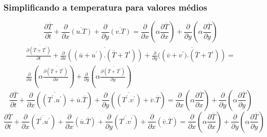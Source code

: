 \documentclass[xcolor=dvipsnames,10pt,aspectratio=169]{beamer}
\begin{document}
		
		\begin{frame}
		\frametitle{Simplificando a temperatura para valores médios}
		\begin{equation}
		\frac{\partial \overline{T}}{\partial t} + {\frac{\partial{}}{\partial{x}} \overline{(u . T)}} + 
		{\frac{\partial{}}{\partial{y}} \overline{(v . T)}} 
		=
		{\frac{\partial{}}{\partial{x}}} \left(\alpha {\frac{\partial{\overline{T}}}{\partial{x}}} \right) +
		{\frac{\partial{}}{\partial{y}}} \left(\alpha {\frac{\partial{\overline{T}}}{\partial{y}}} \right) 
		\end{equation}
		\begin{equation}
		\begin{split}
		\frac{\partial \overline{(\overline{T} + T^\prime)}}{\partial t} +{\frac{\partial{}}{\partial{x}} \overline{\left((\overline{u} + u^\prime) . (\overline{T} + T^\prime) \right)}} + 
		{\frac{\partial{}}{\partial{y}} \overline{(\left(\overline{v} + v^\prime) . (\overline{T} + T^\prime) \right)}} 
		= \\
		{\frac{\partial{}}{\partial{x}}} \left(\alpha {\frac{\partial{\overline{(\overline{T} + T^\prime)}}}{\partial{x}}} \right) +
		{\frac{\partial{}}{\partial{y}}} \left(\alpha {\frac{\partial{\overline{(\overline{T} + T^\prime)}}}{\partial{y}}} \right) 
		\end{split}
		\end{equation}
		\begin{equation}
		\frac{\partial \overline{T}}{\partial t} +\frac{\partial{}}{\partial{x}} \left(\overline{\left({T^\prime . u^\prime}\right)} + \overline{u}.\overline{T}\right)     + 
		\frac{\partial{}}{\partial{y}} \left(\overline{\left({T^\prime . v^\prime}\right)} + \overline{v}.\overline{T}\right) 
		=
		{\frac{\partial{}}{\partial{x}}} \left(\alpha {\frac{\partial{\overline{T}}}{\partial{x}}} \right) +
		{\frac{\partial{}}{\partial{y}}} \left(\alpha {\frac{\partial{\overline{T}}}{\partial{y}}} \right) 
		\end{equation}
		\begin{equation}\label{equation_preparede}
		\frac{\partial \overline{T}}{\partial t} +\frac{\partial{}}{\partial{x}} \left(\overline{T^\prime .  u^\prime}\right) + \frac{\partial{}}{\partial{x}}\left(\overline{u}.\overline{T}\right)     + 
		\frac{\partial{}}{\partial{y}} \left(\overline{T^\prime . v^\prime}\right) + \frac{\partial{}}{\partial{x}}\left(\overline{v}.\overline{T}\right) 
		=
		{\frac{\partial{}}{\partial{x}}} \left(\alpha {\frac{\partial{\overline{T}}}{\partial{x}}} \right) +
		{\frac{\partial{}}{\partial{y}}} \left(\alpha {\frac{\partial{\overline{T}}}{\partial{y}}} \right) 
		\end{equation}
		\end{frame}
		
\end{document}
